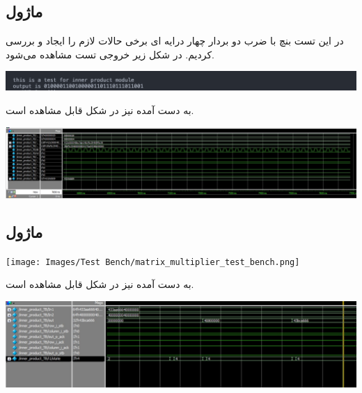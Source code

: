\documentclass[12pt,titlepage,a4page , tikz , multi,table , svgnames,xcdraw]{article}
\begin{document}
\subsection{ماژول }
در این تست بنچ با ضرب دو بردار چهار درایه ای برخی حالات لازم را ایجاد و بررسی کردیم.
در شکل زیر خروجی تست مشاهده می‌شود.
\begin{center}
\includegraphics[scale=0.45]
    {Images/Test Bench/inner_product_test_bench.png}
\end{center}
 به دست آمده نیز در شکل قابل مشاهده است.
\begin{center}
\includegraphics[scale=0.45]
    {Images/Test Bench/inner_product_waveform.jpg}
\end{center}


\subsection{ماژول }


\begin{center}
\texttt{[image: Images/Test Bench/matrix\_multiplier\_test\_bench.png]}
\end{center}
 به دست آمده نیز در شکل قابل مشاهده است.
\begin{center}
\includegraphics[scale=0.56]
    {Images/Test Bench/matrix_multiplier_waveform.jpg}
\end{center}

\newpage
\medskip




\end{document}
